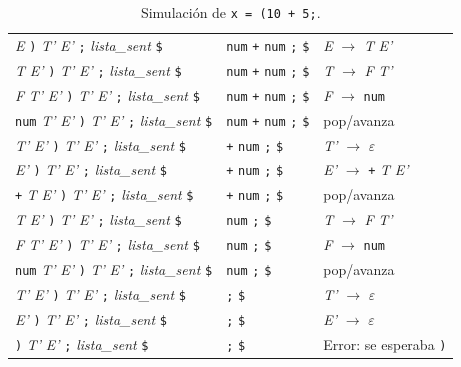 \documentclass[12pt]{article}
\newcommand{\cmd}[1]{\texttt{\small #1}}
\newcommand{\nt}[1]{\textit{#1}}
\begin{document}
\begin{table}[!htbp]
\begin{tabular}{@{}>{\raggedright\arraybackslash}p{5.0cm} >{\raggedright\arraybackslash}p{3.7cm} >{\raggedright\arraybackslash}p{5.6cm}@{}}
\nt{E} \texttt{)} \nt{T'} \nt{E'} \texttt{;} \nt{lista\_sent} \texttt{\$} & \texttt{num} \texttt{+} \texttt{num} \texttt{;} \texttt{\$} & \nt{E} $\rightarrow$ \nt{T} \nt{E'} \\
\nt{T} \nt{E'} \texttt{)} \nt{T'} \nt{E'} \texttt{;} \nt{lista\_sent} \texttt{\$} & \texttt{num} \texttt{+} \texttt{num} \texttt{;} \texttt{\$} & \nt{T} $\rightarrow$ \nt{F} \nt{T'} \\
\nt{F} \nt{T'} \nt{E'} \texttt{)} \nt{T'} \nt{E'} \texttt{;} \nt{lista\_sent} \texttt{\$} & \texttt{num} \texttt{+} \texttt{num} \texttt{;} \texttt{\$} & \nt{F} $\rightarrow$ \texttt{num} \\
\texttt{num} \nt{T'} \nt{E'} \texttt{)} \nt{T'} \nt{E'} \texttt{;} \nt{lista\_sent} \texttt{\$} & \texttt{num} \texttt{+} \texttt{num} \texttt{;} \texttt{\$} & pop/avanza \\
\nt{T'} \nt{E'} \texttt{)} \nt{T'} \nt{E'} \texttt{;} \nt{lista\_sent} \texttt{\$} & \texttt{+} \texttt{num} \texttt{;} \texttt{\$} & \nt{T'} $\rightarrow$ $\varepsilon$ \\
\nt{E'} \texttt{)} \nt{T'} \nt{E'} \texttt{;} \nt{lista\_sent} \texttt{\$} & \texttt{+} \texttt{num} \texttt{;} \texttt{\$} & \nt{E'} $\rightarrow$ \texttt{+} \nt{T} \nt{E'} \\
\texttt{+} \nt{T} \nt{E'} \texttt{)} \nt{T'} \nt{E'} \texttt{;} \nt{lista\_sent} \texttt{\$} & \texttt{+} \texttt{num} \texttt{;} \texttt{\$} & pop/avanza \\
\nt{T} \nt{E'} \texttt{)} \nt{T'} \nt{E'} \texttt{;} \nt{lista\_sent} \texttt{\$} & \texttt{num} \texttt{;} \texttt{\$} & \nt{T} $\rightarrow$ \nt{F} \nt{T'} \\
\nt{F} \nt{T'} \nt{E'} \texttt{)} \nt{T'} \nt{E'} \texttt{;} \nt{lista\_sent} \texttt{\$} & \texttt{num} \texttt{;} \texttt{\$} & \nt{F} $\rightarrow$ \texttt{num} \\
\texttt{num} \nt{T'} \nt{E'} \texttt{)} \nt{T'} \nt{E'} \texttt{;} \nt{lista\_sent} \texttt{\$} & \texttt{num} \texttt{;} \texttt{\$} & pop/avanza \\
\nt{T'} \nt{E'} \texttt{)} \nt{T'} \nt{E'} \texttt{;} \nt{lista\_sent} \texttt{\$} & \texttt{;} \texttt{\$} & \nt{T'} $\rightarrow$ $\varepsilon$ \\
\nt{E'} \texttt{)} \nt{T'} \nt{E'} \texttt{;} \nt{lista\_sent} \texttt{\$} & \texttt{;} \texttt{\$} & \nt{E'} $\rightarrow$ $\varepsilon$ \\
\texttt{)} \nt{T'} \nt{E'} \texttt{;} \nt{lista\_sent} \texttt{\$} & \texttt{;} \texttt{\$} & Error: se esperaba \texttt{)} \\
\bottomrule
\end{tabular}
\caption{Simulación de \cmd{x = (10 + 5;}.}
\label{tab:sim2}
\end{table}
\end{document}

